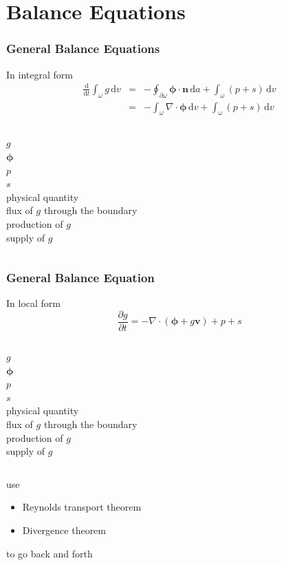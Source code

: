 \documentclass[hide notes,intlimits]{beamer}
\begin{document}
\section{Balance Equations}

\begin{frame}
  \frametitle{General Balance Equations}
  \begin{block}{In integral form}
    \begin{eqnarray}
      \frac{\text{d} }{\text{d} t} \int_{\omega} g \, \text{d} v & = & - \oint_{\partial \omega} \boldsymbol{\phi} \cdot \mathbf{n} \, \text{d} a +  \int_{\omega} \left(p + s\right) \, \text{d} v \\
      & = & - \int_{\omega} \nabla \cdot \boldsymbol{\phi} \, \text{d} v +  \int_{\omega} \left(p + s\right) \, \text{d} v
    \end{eqnarray}
    \begin{columns}
      \column[C]{0.1cm}
      $g$ \\
      $\boldsymbol{\phi}$ \\
      $p$ \\
      $s$ \\
      \column[C]{6cm}
      physical quantity \\
      flux of $g$ through the boundary \\
      production of $g$ \\
      supply of $g$
    \end{columns}
  \end{block}

\end{frame}

\begin{frame}
  \frametitle{General Balance Equation}
  \begin{block}{In local form}
    \begin{equation}
      \frac{\partial g}{\partial t} = - \nabla \cdot \left(\boldsymbol{\phi} + g\mathbf{v}\right) + p + s
    \end{equation}
    \begin{columns}
      \column[C]{0.1cm}
      $g$ \\
      $\boldsymbol{\phi}$ \\
      $p$ \\
      $s$ \\
      \column[C]{6cm}
      physical quantity \\
      flux of $g$ through the boundary \\
      production of $g$ \\
      supply of $g$
    \end{columns}
  \end{block}
  use
  \begin{itemize}
    \item Reynolds transport theorem
    \item Divergence theorem
    \end{itemize}
    to go back and forth
\end{frame}
\end{document}
